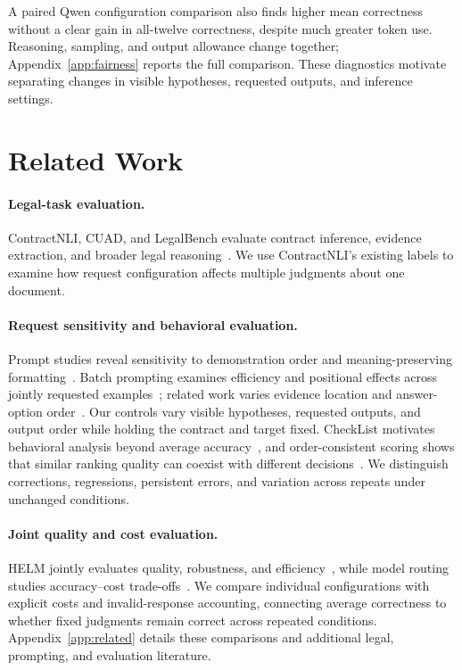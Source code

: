 \documentclass{article}
\begin{document}
A paired Qwen configuration comparison also finds higher mean correctness without a clear gain in all-twelve correctness, despite much greater token use. Reasoning, sampling, and output allowance change together; Appendix~\ref{app:fairness} reports the full comparison. These diagnostics motivate separating changes in visible hypotheses, requested outputs, and inference settings.

\section{Related Work}
\label{sec:related}
\paragraph{Legal-task evaluation.}
ContractNLI, CUAD, and LegalBench evaluate contract inference, evidence extraction, and broader legal reasoning~\citep{koreeda2021contractnli,hendrycks2021cuad,guha2023legalbench}. We use ContractNLI's existing labels to examine how request configuration affects multiple judgments about one document.

\paragraph{Request sensitivity and behavioral evaluation.}
Prompt studies reveal sensitivity to demonstration order and meaning-preserving formatting~\citep{lu2022fantastically,sclar2024quantifying}. Batch prompting examines efficiency and positional effects across jointly requested examples~\citep{cheng2023batchprompting,lin2024batchprompt}; related work varies evidence location and answer-option order~\citep{liu2024lost,zheng2024selectors}. Our controls vary visible hypotheses, requested outputs, and output order while holding the contract and target fixed. CheckList motivates behavioral analysis beyond average accuracy~\citep{ribeiro2020checklist}, and order-consistent scoring shows that similar ranking quality can coexist with different decisions~\citep{frohmann2026equal}. We distinguish corrections, regressions, persistent errors, and variation across repeats under unchanged conditions.

\paragraph{Joint quality and cost evaluation.}
HELM jointly evaluates quality, robustness, and efficiency~\citep{liang2023helm}, while model routing studies accuracy--cost trade-offs~\citep{chen2024frugalgpt,ong2025routellm}. We compare individual configurations with explicit costs and invalid-response accounting, connecting average correctness to whether fixed judgments remain correct across repeated conditions. Appendix~\ref{app:related} details these comparisons and additional legal, prompting, and evaluation literature.
\end{document}
